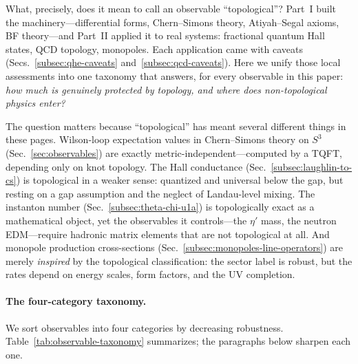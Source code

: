 What, precisely, does it mean to call an observable ``topological''? Part~I built the machinery---differential forms, Chern--Simons theory, Atiyah--Segal axioms, BF theory---and Part~II applied it to real systems: fractional quantum Hall states, QCD topology, monopoles. Each application came with caveats (Secs.~\ref{subsec:qhe-caveats} and~\ref{subsec:qcd-caveats}). Here we unify those local assessments into one taxonomy that answers, for every observable in this paper: \emph{how much is genuinely protected by topology, and where does non-topological physics enter?}

The question matters because ``topological'' has meant several different things in these pages. Wilson-loop expectation values in Chern--Simons theory on $S^3$ (Sec.~\ref{sec:observables}) are exactly metric-independent---computed by a TQFT, depending only on knot topology. The Hall conductance (Sec.~\ref{subsec:laughlin-to-cs}) is topological in a weaker sense: quantized and universal below the gap, but resting on a gap assumption and the neglect of Landau-level mixing. The instanton number (Sec.~\ref{subsec:theta-chi-u1a}) is topologically exact as a mathematical object, yet the observables it controls---the $\eta'$ mass, the neutron EDM---require hadronic matrix elements that are not topological at all. And monopole production cross-sections (Sec.~\ref{subsec:monopoles-line-operators}) are merely \emph{inspired} by the topological classification: the sector label is robust, but the rates depend on energy scales, form factors, and the UV completion.

\paragraph{The four-category taxonomy.}
We sort observables into four categories by decreasing robustness. Table~\ref{tab:observable-taxonomy} summarizes; the paragraphs below sharpen each one.

